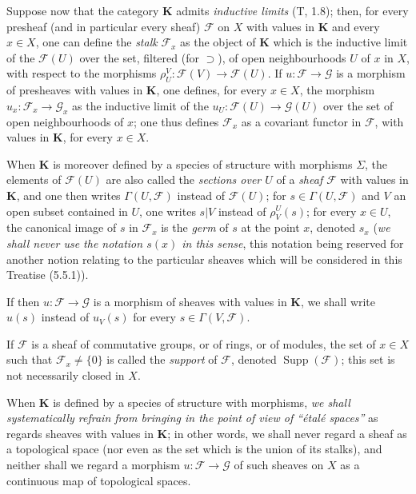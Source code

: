 \begin{env}[3.1.6]
\label{0.3.1.6}
Suppose now that the category $\mathbf{K}$ admits \emph{inductive
limits} (T, 1.8); then, for every presheaf (and in particular every
sheaf) $\mathcal{F}$ on $X$ with values in $\mathbf{K}$ and every $x\in X$,
one can define the \emph{stalk} $\mathcal{F}_x$ as the object of $\mathbf{K}$
which is the inductive limit of the $\mathcal{F}(U)$ over the set, filtered (for
$\supset$), of open neighbourhoods $U$ of $x$ in $X$, with respect to the morphisms
$\rho_U^V:\mathcal{F}(V)\to\mathcal{F}(U)$. If
$u:\mathcal{F}\to\mathcal{G}$ is a morphism of presheaves with values in
$\mathbf{K}$, one defines, for every $x\in X$, the morphism
$u_x:\mathcal{F}_x\to\mathcal{G}_x$ as the inductive limit of the
$u_U:\mathcal{F}(U)\to\mathcal{G}(U)$ over the set of open neighbourhoods
of $x$; one thus defines $\mathcal{F}_x$ as a covariant functor in
$\mathcal{F}$, with values in $\mathbf{K}$, for every $x\in X$.

When $\mathbf{K}$ is moreover defined by a species of structure with
morphisms $\Sigma$, the elements of $\mathcal{F}(U)$ are also called the
\emph{sections over $U$} of a \emph{sheaf $\mathcal{F}$} with values in
$\mathbf{K}$, and one then writes $\Gamma(U,\mathcal{F})$ instead of
$\mathcal{F}(U)$; for $s\in\Gamma(U,\mathcal{F})$ and $V$ an open subset contained in
$U$, one writes $s|V$ instead of $\rho_V^U(s)$; for every $x\in U$, the
canonical image of $s$ in $\mathcal{F}_x$ is the \emph{germ} of $s$ at the point $x$,
denoted $s_x$ (\emph{we shall never use the notation $s(x)$ in this sense},
this notation being reserved for another notion relating to the
particular sheaves which will be considered in this Treatise (5.5.1)).

If then $u:\mathcal{F}\to\mathcal{G}$ is a morphism of sheaves with values
in $\mathbf{K}$, we shall write $u(s)$ instead of $u_V(s)$ for every
$s\in\Gamma(V,\mathcal{F})$.

If $\mathcal{F}$ is a sheaf of commutative groups, or of rings, or of
modules, the set of $x\in X$ such that
$\mathcal{F}_x\neq\{0\}$ is called the \emph{support} of $\mathcal{F}$, denoted
$\operatorname{Supp}(\mathcal{F})$; this set is not necessarily
closed in $X$.

When $\mathbf{K}$ is defined by a species of structure with morphisms,
\emph{we shall systematically refrain from bringing in the point of
view of ``étalé spaces''} as regards sheaves with values in
$\mathbf{K}$; in other words, we shall never regard a sheaf as
a topological space (nor even as the set which is the union of its stalks), and
neither shall we regard a morphism
$u:\mathcal{F}\to\mathcal{G}$ of such sheaves on $X$ as a continuous
map of topological spaces.
\end{env}

